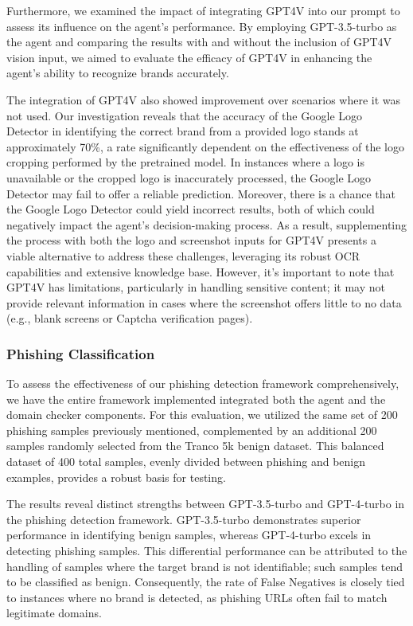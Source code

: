 Furthermore, we examined the impact of integrating GPT4V into our prompt to assess its influence on the agent's performance. By employing GPT-3.5-turbo as the agent and comparing the results with and without the inclusion of GPT4V vision input, we aimed to evaluate the efficacy of GPT4V in enhancing the agent's ability to recognize brands accurately. 


The integration of GPT4V also showed improvement over scenarios where it was not used. Our investigation reveals that the accuracy of the Google Logo Detector in identifying the correct brand from a provided logo stands at approximately 70\%, a rate significantly dependent on the effectiveness of the logo cropping performed by the pretrained model. In instances where a logo is unavailable or the cropped logo is inaccurately processed, the Google Logo Detector may fail to offer a reliable prediction. Moreover, there is a chance that the Google Logo Detector could yield incorrect results, both of which could negatively impact the agent's decision-making process. As a result, supplementing the process with both the logo and screenshot inputs for GPT4V presents a viable alternative to address these challenges, leveraging its robust OCR capabilities and extensive knowledge base. However, it's important to note that GPT4V has limitations, particularly in handling sensitive content; it may not provide relevant information in cases where the screenshot offers little to no data (e.g., blank screens or Captcha verification pages). 

\subsubsection{Phishing Classification}

To assess the effectiveness of our phishing detection framework comprehensively, we have the entire framework implemented integrated both the agent and the domain checker components. For this evaluation, we utilized the same set of 200 phishing samples previously mentioned, complemented by an additional 200 samples randomly selected from the Tranco 5k benign dataset. This balanced dataset of 400 total samples, evenly divided between phishing and benign examples, provides a robust basis for testing.

The results reveal distinct strengths between GPT-3.5-turbo and GPT-4-turbo in the phishing detection framework. GPT-3.5-turbo demonstrates superior performance in identifying benign samples, whereas GPT-4-turbo excels in detecting phishing samples. This differential performance can be attributed to the handling of samples where the target brand is not identifiable; such samples tend to be classified as benign. Consequently, the rate of False Negatives is closely tied to instances where no brand is detected, as phishing URLs often fail to match legitimate domains.

